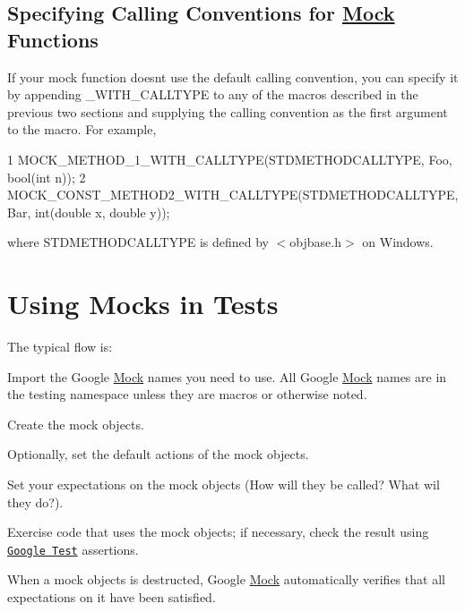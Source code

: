 \subsection*{Specifying Calling Conventions for \hyperlink{class_mock}{Mock} Functions}

If your mock function doesn\textquotesingle{}t use the default calling convention, you can specify it by appending {\ttfamily \+\_\+\+W\+I\+T\+H\+\_\+\+C\+A\+L\+L\+T\+Y\+PE} to any of the macros described in the previous two sections and supplying the calling convention as the first argument to the macro. For example, 
\begin{DoxyCode}
1 MOCK\_METHOD\_1\_WITH\_CALLTYPE(STDMETHODCALLTYPE, Foo, bool(int n));
2 MOCK\_CONST\_METHOD2\_WITH\_CALLTYPE(STDMETHODCALLTYPE, Bar, int(double x, double y));
\end{DoxyCode}
 where {\ttfamily S\+T\+D\+M\+E\+T\+H\+O\+D\+C\+A\+L\+L\+T\+Y\+PE} is defined by {\ttfamily $<$objbase.\+h$>$} on Windows.

\section*{Using Mocks in Tests}

The typical flow is\+:
\begin{DoxyEnumerate}
\item Import the Google \hyperlink{class_mock}{Mock} names you need to use. All Google \hyperlink{class_mock}{Mock} names are in the {\ttfamily testing} namespace unless they are macros or otherwise noted.
\end{DoxyEnumerate}
\begin{DoxyEnumerate}
\item Create the mock objects.
\end{DoxyEnumerate}
\begin{DoxyEnumerate}
\item Optionally, set the default actions of the mock objects.
\end{DoxyEnumerate}
\begin{DoxyEnumerate}
\item Set your expectations on the mock objects (How will they be called? What wil they do?).
\end{DoxyEnumerate}
\begin{DoxyEnumerate}
\item Exercise code that uses the mock objects; if necessary, check the result using \href{http://code.google.com/p/googletest/}{\tt Google Test} assertions.
\end{DoxyEnumerate}
\begin{DoxyEnumerate}
\item When a mock objects is destructed, Google \hyperlink{class_mock}{Mock} automatically verifies that all expectations on it have been satisfied.
\end{DoxyEnumerate}

